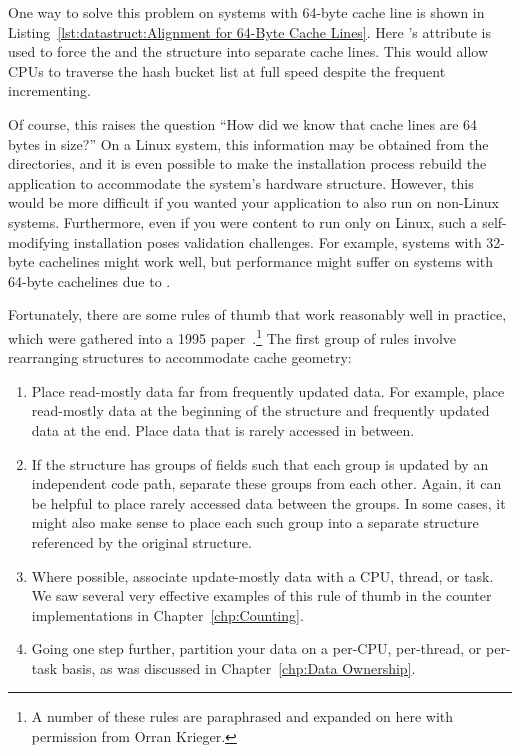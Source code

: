 One way to solve this problem on systems with 64-byte cache line is shown in
Listing~\ref{lst:datastruct:Alignment for 64-Byte Cache Lines}.
Here \GCC's  attribute is used to force the 
and the  structure into separate cache lines.
This would allow CPUs to traverse the hash bucket list at full speed
despite the frequent incrementing.

Of course, this raises the question ``How did we know that cache lines
are 64 bytes in size?''
On a Linux system, this information may be obtained from the
 directories, and it is even
possible to make the installation process rebuild the application to
accommodate the system's hardware structure.
However, this would be more difficult if you wanted your application to
also run on non-Linux systems.
Furthermore, even if you were content to run only on Linux, such a
self-modifying installation poses validation challenges.
For example, systems with 32-byte cachelines might work well, but
performance might suffer on systems with 64-byte cachelines due
to .

Fortunately, there are some rules of thumb that work reasonably well in
practice, which were gathered into a 1995
paper~\cite{BenjaminGamsa95a}.\footnote{
	A number of these rules are paraphrased and expanded on here
	with permission from Orran Krieger.}
The first group of rules involve rearranging structures to accommodate
cache geometry:

\begin{enumerate}
\item	Place read-mostly data far from frequently updated data.
	For example, place read-mostly data at the beginning of the
	structure and frequently updated data at the end.
	Place data that is rarely accessed in between.
\item	If the structure has groups of fields such that each group is
	updated by an independent code path, separate these groups
	from each other.
	Again, it can be helpful to place rarely accessed data
	between the groups.
	In some cases, it might also make sense to place each such group
	into a separate structure referenced by the original structure.
\item	Where possible, associate update-mostly data with a CPU, thread,
	or task.
	We saw several very effective examples of this rule of thumb
	in the counter implementations in
	Chapter~\ref{chp:Counting}.
\item	Going one step further, partition your data on a per-CPU,
	per-thread, or per-task basis, as was discussed in
	Chapter~\ref{chp:Data Ownership}.
\end{enumerate}


